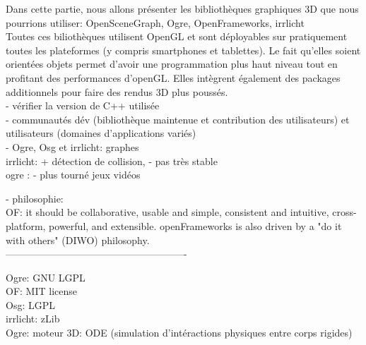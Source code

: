 Dans cette partie, nous allons présenter les bibliothèques graphiques 3D que nous pourrions utiliser: OpenSceneGraph, Ogre, OpenFrameworks, irrlicht \\
Toutes ces biliothèques utilisent OpenGL et sont déployables sur pratiquement toutes les plateformes (y compris smartphones et tablettes). Le fait qu'elles soient orientées objets permet d'avoir une programmation plus haut niveau tout en profitant des performances d'openGL. Elles intègrent également des packages additionnels pour faire des rendus 3D plus poussés. \\

- vérifier la version de C++ utilisée \\
- communautés dév (bibliothèque maintenue et contribution des utilisateurs) et utilisateurs (domaines d'applications variés) \\

- Ogre, Osg et irrlicht: graphes \\


irrlicht: + détection de collision, - pas très stable \\
ogre : - plus tourné jeux vidéos 

- philosophie: \\
OF:  it should be collaborative, usable and simple, consistent and intuitive, cross-platform, powerful, and extensible. openFrameworks is also driven by a "do it with others" (DIWO) philosophy. \\

-------------------------------------------------------

Ogre: GNU LGPL \\
OF: MIT license \\
Osg: LGPL \\
irrlicht: zLib \\

Ogre: moteur 3D: ODE (simulation d'intéractions physiques entre corps rigides)
